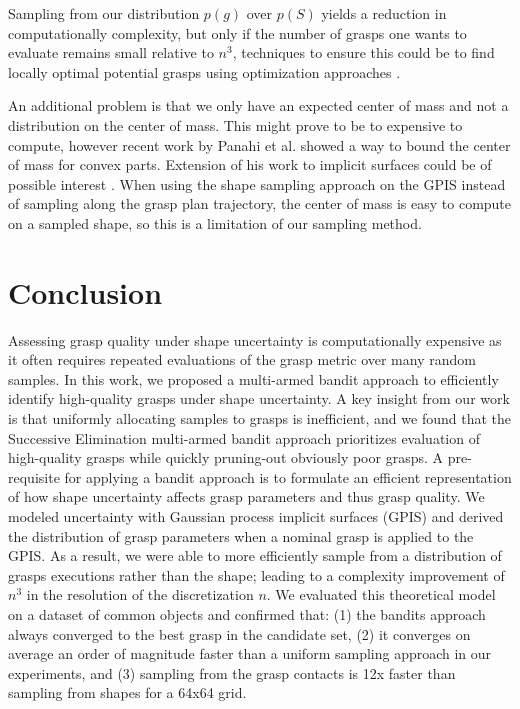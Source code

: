 \documentclass[letterpaper, 10 pt, conference]{ieeeconf}  %
\begin{document}
Sampling from our distribution $p(g)$ over $p(S)$ yields a reduction in computationally complexity, but only if the number of grasps one wants to evaluate remains small relative to $n^3$, techniques to ensure this could be to find locally optimal potential grasps using optimization approaches \cite{mahler2015opt}. 

An additional problem is that we only have an expected center of mass and not a distribution on the center of mass. This might prove to be to expensive to compute, however recent work by Panahi et al. showed a way to bound the center of mass for convex parts. Extension of his work to implicit surfaces could be of possible interest \cite{panahi2014bounding}.  When using the shape sampling approach on the GPIS instead of sampling along the grasp plan trajectory, the center of mass is easy to compute on a sampled shape, so this is a limitation of our sampling method.

\section{Conclusion}
Assessing grasp quality under shape uncertainty is computationally expensive as it often requires repeated evaluations of the grasp metric over many random samples.
In this work, we proposed a multi-armed bandit approach to efficiently identify high-quality grasps under shape uncertainty. 
A key insight from our work is that uniformly allocating samples to grasps is inefficient, and
 we found that the Successive Elimination multi-armed bandit approach prioritizes evaluation of high-quality grasps while quickly pruning-out obviously poor grasps.
A pre-requisite for applying a bandit approach is to formulate an efficient representation of how shape uncertainty affects grasp parameters and thus grasp quality.
We modeled uncertainty with Gaussian process implicit surfaces (GPIS) and derived the distribution of grasp parameters when a nominal grasp is applied to the GPIS.
As a result, we were able to more efficiently sample from a distribution of grasps executions rather than the shape; leading to a complexity improvement of $n^3$ in the resolution of the discretization $n$.
We evaluated this theoretical model on a dataset of common objects and confirmed that: (1) the bandits approach always converged to the best grasp in the candidate set, (2) it converges on average an order of magnitude faster than a uniform sampling approach in our experiments, and (3) sampling from the grasp contacts is 12x faster than sampling from shapes for a 64x64 grid.
\end{document}

